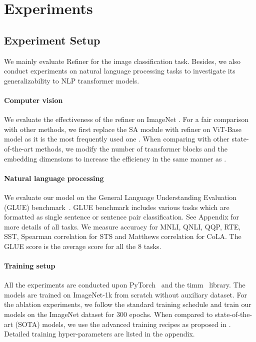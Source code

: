 \section{Experiments}
\label{sec:exp}



\subsection{Experiment Setup}

We mainly evaluate Refiner for the image classification task. Besides, we also conduct experiments on natural language processing tasks to investigate its generalizability to NLP transformer models. 
\vspace{-3mm}
\paragraph{Computer vision} We evaluate the effectiveness of the refiner on ImageNet \cite{deng2009imagenet}. For a fair comparison with other methods, we first replace the SA module with refiner on ViT-Base \cite{dosovitskiy2020image} model as it is the most frequently used one \cite{dosovitskiy2020image, touvron2020training, yuan2020revisiting, touvron2021going}. When comparing with other state-of-the-art methods, we modify the number of transformer blocks and the embedding dimensions to increase the efficiency in the same manner as \cite{yuan2021tokens, zhou2021deepvit}. 
\vspace{-3mm}
\paragraph{Natural language processing} We evaluate our model on the General Language Understanding Evaluation (GLUE) benchmark~\cite{wang2018glue}. GLUE benchmark includes various tasks which are formatted as single sentence or sentence pair classification. See Appendix for more details of all tasks.
We measure accuracy for MNLI, QNLI, QQP, RTE, SST, Spearman correlation for STS and Matthews correlation for CoLA. 
The GLUE score is the average   score for all the 8 tasks. 


\vspace{-3mm}
\paragraph{Training setup} All the experiments are   conducted upon PyTorch~\cite{paszke2019pytorch} and the timm~\cite{rw2019timm} library. The models are trained on ImageNet-1k from scratch without auxiliary dataset.
For the ablation experiments, we follow the standard training schedule and train our models on the ImageNet dataset for 300 epochs. When compared to state-of-the-art (SOTA) models, we use the advanced training recipes as proposed in \cite{touvron2020training}. Detailed training hyper-parameters   are listed in the appendix.  


